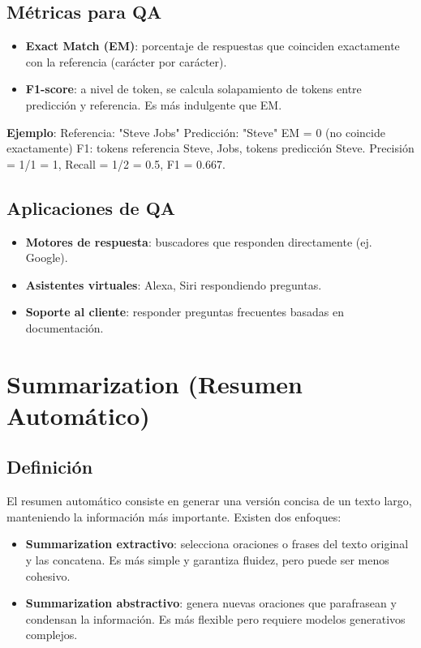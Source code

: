 \documentclass[12pt,a4paper,openany,oneside]{book}
\begin{document}
\subsection{Métricas para QA}
\begin{itemize}
    \item \textbf{Exact Match (EM)}: porcentaje de respuestas que coinciden exactamente con la referencia (carácter por carácter).
    \item \textbf{F1-score}: a nivel de token, se calcula solapamiento de tokens entre predicción y referencia. Es más indulgente que EM.
\end{itemize}

\textbf{Ejemplo}:
Referencia: "Steve Jobs"
Predicción: "Steve"
EM = 0 (no coincide exactamente)
F1: tokens referencia {Steve, Jobs}, tokens predicción {Steve}. Precisión = 1/1 = 1, Recall = 1/2 = 0.5, F1 = 0.667.

\subsection{Aplicaciones de QA}
\begin{itemize}
    \item \textbf{Motores de respuesta}: buscadores que responden directamente (ej. Google).
    \item \textbf{Asistentes virtuales}: Alexa, Siri respondiendo preguntas.
    \item \textbf{Soporte al cliente}: responder preguntas frecuentes basadas en documentación.
\end{itemize}

\section{Summarization (Resumen Automático)}

\subsection{Definición}
El resumen automático consiste en generar una versión concisa de un texto largo, manteniendo la información más importante. Existen dos enfoques:

\begin{itemize}
    \item \textbf{Summarization extractivo}: selecciona oraciones o frases del texto original y las concatena. Es más simple y garantiza fluidez, pero puede ser menos cohesivo.
    \item \textbf{Summarization abstractivo}: genera nuevas oraciones que parafrasean y condensan la información. Es más flexible pero requiere modelos generativos complejos.
\end{itemize}
\end{document}

